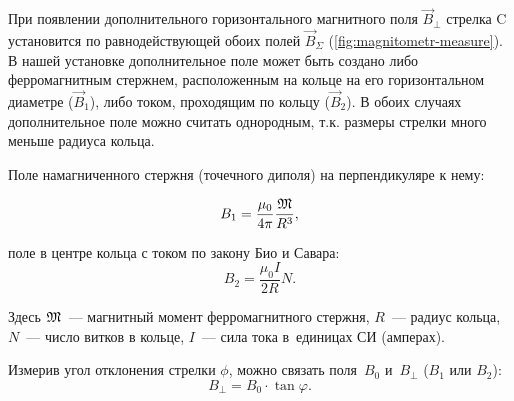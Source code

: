 
При появлении дополнительного горизонтального магнитного поля $\vec{B}_{\perp}$ стрелка C установится по равнодействующей
обоих полей $\vec{B}_{\Sigma}$ (\ref{fig:magnitometr-measure}). В нашей установке дополнительное поле может быть создано либо ферромагнитным
стержнем, расположенным на кольце на его горизонтальном диаметре ($\vec{B}_1$), либо током, проходящим по кольцу
($\vec{B}_2$). В обоих случаях дополнительное поле можно считать однородным, т.к. размеры стрелки много меньше радиуса
кольца.

Поле намагниченного стержня (точечного диполя) на перпендикуляре к нему:

\begin{equation}
	B_1=\frac{\mu_0}{4\pi}\frac{\mathfrak M}{R^3},
\end{equation}

поле в центре кольца с током по закону Био и Савара:
\begin{equation}
	B_2=\frac{\mu_0 I}{2R}N.
\end{equation}

Здесь $\mathfrak M$~--- магнитный момент ферромагнитного стержня, $R$~--- радиус кольца, $N$~--- число витков в кольце,
$I$~--- сила тока в~единицах СИ (амперах).

Измерив угол отклонения стрелки $\phi$, можно связать поля~$B_0$ и~$B_{\perp}$ ($B_1$ или $B_2$):
\begin{equation}
	B_{\perp}=B_0\cdot \tan{\varphi}.
\end{equation}

